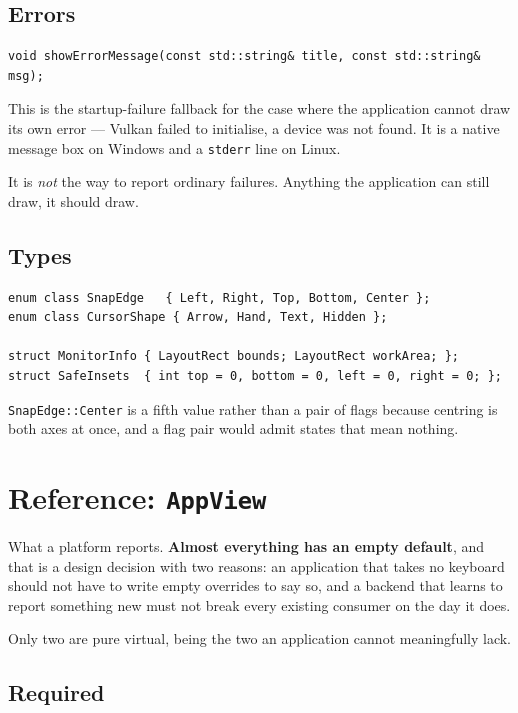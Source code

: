 \documentclass[11pt,a4paper]{article}
\begin{document}
\subsection{Errors}

\begin{lstlisting}
void showErrorMessage(const std::string& title, const std::string& msg);
\end{lstlisting}

\noindent This is the startup-failure fallback for the case where the application cannot
draw its own error --- Vulkan failed to initialise, a device was not found. It
is a native message box on Windows and a \texttt{stderr} line on Linux.

It is \emph{not} the way to report ordinary failures. Anything the application
can still draw, it should draw.

\subsection{Types}

\begin{lstlisting}
enum class SnapEdge   { Left, Right, Top, Bottom, Center };
enum class CursorShape { Arrow, Hand, Text, Hidden };

struct MonitorInfo { LayoutRect bounds; LayoutRect workArea; };
struct SafeInsets  { int top = 0, bottom = 0, left = 0, right = 0; };
\end{lstlisting}

\texttt{SnapEdge::Center} is a fifth value rather than a pair of flags because
centring is both axes at once, and a flag pair would admit states that mean
nothing.

\section{Reference: \texttt{AppView}}

What a platform reports. \textbf{Almost everything has an empty default}, and
that is a design decision with two reasons: an application that takes no
keyboard should not have to write empty overrides to say so, and a backend that
learns to report something new must not break every existing consumer on the day
it does.

Only two are pure virtual, being the two an application cannot meaningfully
lack.

\subsection{Required}
\end{document}
